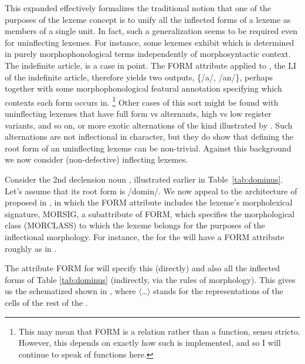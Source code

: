 \documentclass[output=paper,colorlinks,citecolor=brown]{langscibook}
\begin{document}
This expanded  effectively formalizes the traditional notion that one of the purposes of the lexeme concept is to unify all the inflected forms of a lexeme as members of a single unit. In fact, such a generalization seems to be required even for uninflecting lexemes. For instance, some lexemes exhibit  which is determined in purely morphophonological terms independently of morphosyntactic context. The  indefinite article,  is a case in point. The FORM attribute applied to , the LI  of the indefinite article, therefore yields two outputs, \{/a/, /an/\}, perhaps together with some morphophonological featural annotation specifying which contexts each form occurs in.%
\footnote{%
	This may mean that FORM is a relation rather than a function, sensu stricto. However, this depends on exactly how such  is implemented, and so I will continue to speak of functions here. 
} %
Other cases of this sort might be found with uninflecting lexemes that have full form vs  alternants, high vs low register variants, and so on, or more exotic alternations of the kind illustrated by  . Such alternations are not inflectional in character, but they do show that defining the root form of an uninflecting lexeme can be non-trivial.  %
Against this background we now consider (non-defective) inflecting lexemes. 

Consider the 2nd declension    noun , illustrated earlier in Table~\ref{tab:dominus}. Let's assume that its root form is  /domin/. We now appeal to the architecture of  proposed in \citet[184]{spencer2013}, in which the FORM attribute includes the lexeme's morpholexical signature, MORSIG, a subattribute of FORM, which specifies the morphological class (MORCLASS) to which the lexeme belongs for the purposes of the inflectional morphology. For instance, the  for the   will have a FORM attribute roughly as in .

\ea\label{dominusform1}
\z
The attribute FORM for  will specify this  (directly) and also all the inflected forms of Table \ref{tab:dominus} (indirectly, via the rules of  morphology). This gives us the schematized  shown in , where $\langle$\ldots$\rangle$ stands for the representations of the cells of the rest of the .
\end{document}
